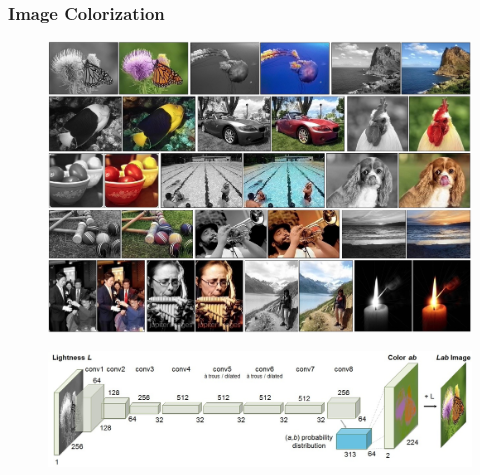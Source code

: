 \documentclass[presentation]{beamer}
\begin{document}
\begin{frame}[allowframebreaks]
    \frametitle{Image Colorization}

    \begin{figure}
        \centering
        \includegraphics[width=0.95\linewidth]{6.jpg}
        \caption{}
    \end{figure}

    \begin{figure}
        \centering
        \includegraphics[width=0.95\linewidth]{6_1.jpg}
        \caption{}\cite{zhang2016colorful}
    \end{figure}

\end{frame}
\end{document}
